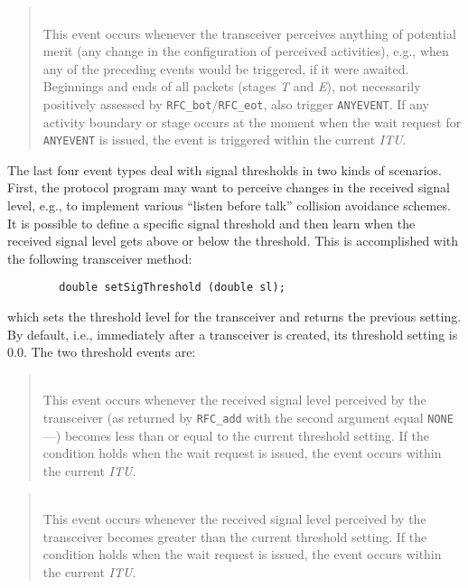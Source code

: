 \begin{quote}
\noindent{}\\ \hspace{0in}
This event occurs whenever the transceiver perceives anything of
potential merit (any change in the configuration of perceived activities),
e.g., when any of the preceding events would be triggered,
if it were awaited.
Beginnings and ends of all packets (stages {\em T\/} and {\em E\/}),
not necessarily
positively assessed by {\tt RFC\_bot}/{\tt RFC\_eot}, also
trigger {\tt ANYEVENT}.
If any activity boundary or stage occurs at the moment when the wait request
for {\tt ANYEVENT} is issued,
the event is triggered within the current {\em ITU}.
\end{quote}

The last four event types deal with signal thresholds in two kinds of
scenarios.
First, the protocol program may want to perceive changes in the received signal
level, e.g., to implement various ``listen before talk'' collision avoidance
schemes.
It is possible to define a specific signal threshold and then learn when the
received signal level gets above or below the threshold.
This is accomplished with the following transceiver method:
\begin{verbatim}
        double setSigThreshold (double sl);
\end{verbatim}
\noindent
which sets the threshold level for the transceiver and returns the previous
setting.
By default, i.e., immediately after a transceiver is created, its threshold
setting is 0.0.
The two threshold events are:

\begin{quote}
\noindent{}\\ \hspace{0in}
This event occurs whenever the received signal level perceived by the
transceiver (as returned by {\tt RFC\_add} with the second argument equal
{\tt NONE}---)
becomes less than or equal to the current threshold setting.
If the condition holds when the wait request is issued, the event occurs
within the current {\em ITU}.
\end{quote}

\begin{quote}
\noindent{}\\ \hspace{0in}
This event occurs whenever the received signal level perceived by the
transceiver becomes greater than the current threshold setting.
If the condition holds when the wait request is issued, the event occurs
within the current {\em ITU}.
\end{quote}

